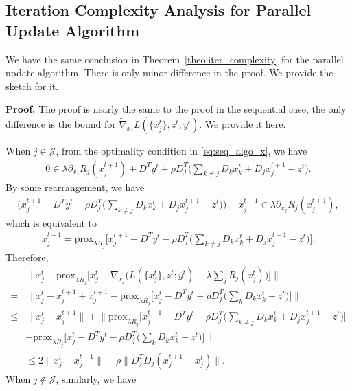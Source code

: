 \subsection{Iteration Complexity Analysis for Parallel Update Algorithm}
We have the same conclusion in Theorem~\ref{theo:iter_complexity} for the parallel update algorithm. There is only minor difference in the proof. We provide the sketch for it. 

{\bf Proof.} The proof is nearly the same to the proof in the sequential case, the only difference is the bound for $\tilde{\nabla}_{x_j} L(\{x^t_j\}, z^t; y^t)$. We provide it here.

When $j\in\mathcal{J}$, from the optimality condition in \eqref{eq:seq_algo_x}, we have 
\begin{align}
    0 \in \lambda\partial_{x_j}R_j(x_j^{t+1}) + D^Ty^t + \rho D_j^T\big(\sum_{k\not=j} D_kx_k^{t} + D_jx_j^{t+1} - z^{t}\big).\nonumber
\end{align}
By some rearrangement, we have
\begin{align}
    \big(x_j^{t+1} - D^Ty^t - \rho D_j^T\big(\sum_{k\not=j} D_kx_k^{t}+ D_jx_j^{t+1} - z^{t}\big)\big) - x_j^{t+1} \in \lambda\partial_{x_j}R_j(x_j^{t+1}),\nonumber
\end{align}
which is equivalent to 
\begin{align}
    x_j^{t+1} = \text{prox}_{\lambda R_j}\big[x_j^{t+1} - D^Ty^t - \rho D_j^T\big(\sum_{k\not=j} D_kx_k^{t}+ D_jx_j^{t+1} - z^{t}\big)\big]. 
\end{align}
Therefore,
\begin{align}
    & \|x_j^t - \text{prox}_{\lambda R_j} \big[x_j^t-\nabla_{x_j}\big(L(\{x^t_j\}, z^t; y^t) - \lambda\sum_j R_j(x_j^t)\big)\big]\|\nonumber\\
    = & \big\|x_j^t - x_j^{t+1} + x_j^{t+1} - \text{prox}_{\lambda R_j}\big[x_j^{t} - D^Ty^t - \rho D_j^T\big(\sum_{k} D_kx_k^{t} - z^{t}\big)\big]\big\|\nonumber\\
    \le & \|x_j^t - x_j^{t+1}\| + \big\|  \text{prox}_{\lambda R_j}\big[x_j^{t+1} - D^Ty^t - \rho D_j^T\big( \sum_{k\not=j} D_kx_k^{t}+ D_jx_j^{t+1} - z^{t}\big)\big]\nonumber\\
    &  - \text{prox}_{\lambda R_j}\big[x_j^{t} - D^Ty^t - \rho D_j^T\big(\sum_{k} D_kx_k^{t} - z^{t}\big)\big]\big\|\nonumber\\
    & \le 2\|x_j^t - x_j^{t+1}\| + \rho\|D_j^TD_j(x_j^{t+1} - x_j^t)\|. \label{eq:proof_pal_bound_V_1}
\end{align}
When $j\not\in\mathcal{J}$, similarly, we have
